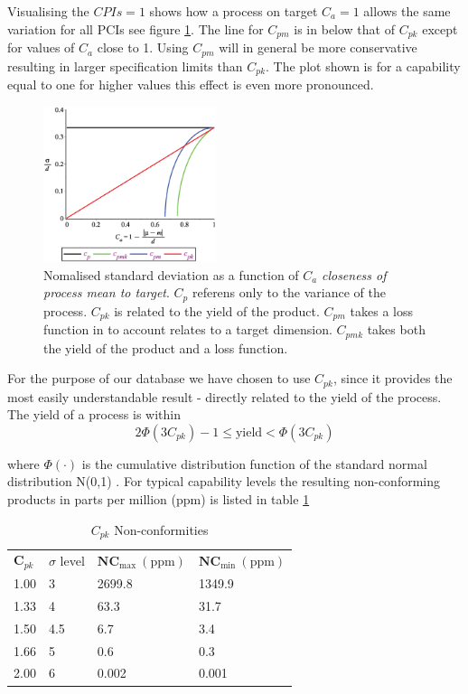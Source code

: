 \documentclass[aip,amsmath, reprint, author-year]{revtex4-1}
\begin{document}
Visualising the $CPIs = 1$  shows how a process on target $C_a = 1$ allows the same variation for all PCIs see figure \ref{fig:CPI}. 
The line for $C_{pm}$ is in below that of $C_{pk}$ except for values of $C_a$ close to 1. 
Using $C_{pm}$ will in general be more conservative resulting in larger specification limits than $C_{pk}$. The plot shown is for a capability equal to one for higher values this effect is even more pronounced.

\begin{figure}
\includegraphics[width=0.45\textwidth]{graph_postscript_test.eps}
\caption{\label{fig:CPI} Nomalised standard deviation as a function of $C_a$ \emph{closeness of process mean to target}. $C_p$ referens only to the variance of the process. 
$C_{pk}$ is related to the yield of the product. $C_{pm}$ takes a loss function in to account relates to a target dimension. 
$C_{pmk}$ takes both the yield of the product and a loss function. }
\end{figure}

For the purpose of our database we have chosen to use $C_{pk}$, since it provides the most easily understandable result - directly related to the yield of the process. The yield of a process is within
\begin{equation}
	2\Phi(3C_{pk})-1 \leq \text{yield} < \Phi(3C_{pk}) \nonumber
\end{equation}

where $\Phi(\cdot)$ is the cumulative distribution function of the standard normal distribution N(0,1) \citep{boyles1991taguchi}. 
For typical capability levels the resulting non-conforming products in parts per million (ppm) is listed in table \ref{tab:cpl_nc}

\begin{table}
\begin{ruledtabular}
\caption{\label{tab:cpl_nc} $C_{pk}$ Non-conformities}
\begin{tabular}{llll}
  $\mathbf{C}_{pk}$	& $\sigma$ level	& $\mathbf{NC_\mathrm{max}} \mathrm{\ (ppm)}$	&  $\mathbf{NC_\mathrm{min}} \mathrm{\ (ppm)}$	\\
  1.00	& 3		& 2699.8		& 1349.9		\\
  1.33 	& 4 		& 63.3		& 31.7 		\\
  1.50 	& 4.5 	& 6.7		& 3.4		\\
  1.66	& 5		& 0.6		& 0.3		\\
  2.00	& 6		& 0.002		& 0.001		\\
\end{tabular}%
\end{ruledtabular}
\end{table}
\end{document}
